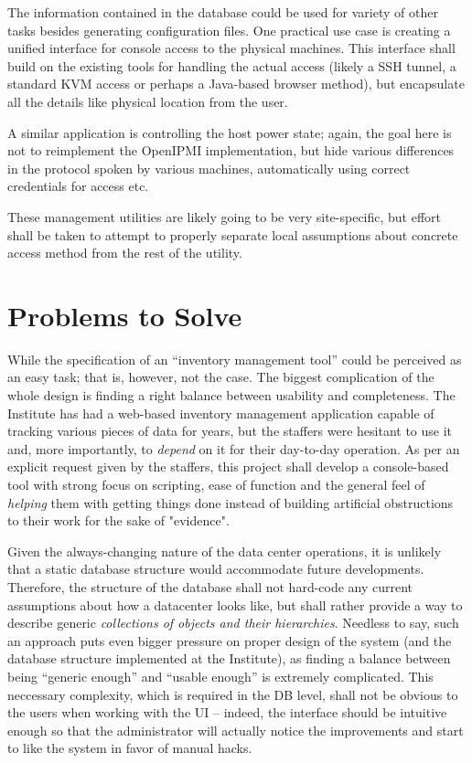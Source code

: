\documentclass{article}
\begin{document}
The information contained in the database could be used for variety of other tasks besides generating configuration files.  One
practical use case is creating a unified interface for console access to the physical machines.  This interface shall build on the
existing tools for handling the actual access (likely a SSH tunnel, a standard KVM access or perhaps a Java-based browser method),
but encapsulate all the details like physical location from the user.

A similar application is controlling the host power state; again, the goal here is not to reimplement the OpenIPMI implementation,
but hide various differences in the protocol spoken by various machines, automatically using correct credentials for access etc.

These management utilities are likely going to be very site-specific, but effort shall be taken to attempt to properly separate
local assumptions about concrete access method from the rest of the utility.

\section{Problems to Solve}

While the specification of an ``inventory management tool'' could be perceived as an easy task; that is, however, not
the case.  The biggest complication of the whole design is finding a right balance between usability and completeness.  The
Institute has had a web-based inventory management application capable of tracking various pieces of data for years, but the
staffers were hesitant to use it and, more importantly, to {\em depend} on it for their day-to-day operation.  As per an explicit request given
by the staffers, this project shall develop a console-based tool with strong focus on scripting, ease of function and the general
feel of {\em helping} them with getting things done instead of building artificial obstructions to their work for the sake of "evidence".

Given the always-changing nature of the data center operations, it is unlikely that a static database structure would accommodate
future developments.  Therefore, the structure of the database shall not hard-code any current assumptions about how a datacenter looks
like, but shall rather provide a way to describe generic {\em collections of objects and their hierarchies}.  Needless to say,
such an approach puts even bigger pressure on proper design of the system (and the database structure implemented at the Institute), as
finding a balance between being ``generic enough'' and ``usable enough'' is extremely complicated.  This neccessary complexity, which
is required in the DB level, shall not be obvious to the users when working with the UI -- indeed, the interface should be
intuitive enough so that the administrator will actually notice the improvements and start to like the system in favor of
manual hacks. 
\end{document}
